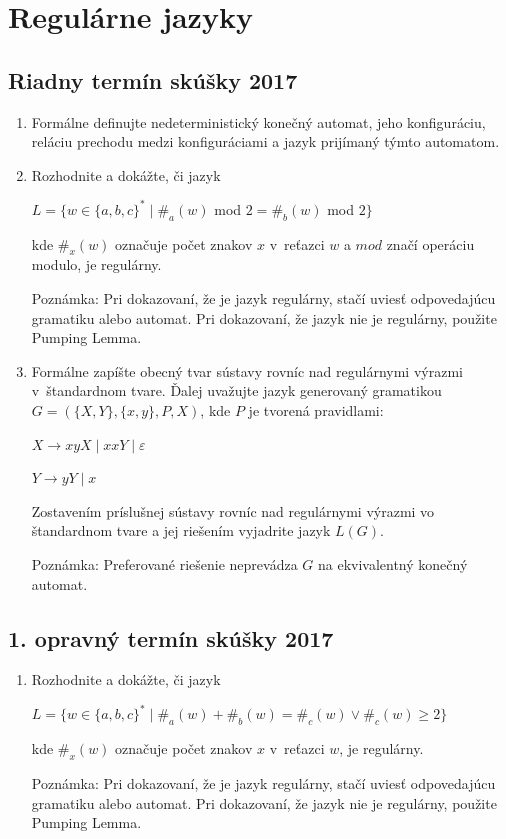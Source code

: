 \documentclass[11pt,a4paper]{article}
\begin{document}
	\section{Regulárne jazyky}

		\subsection{Riadny termín skúšky 2017}

		\begin{enumerate}
			\item Formálne definujte nedeterministický konečný automat, jeho konfiguráciu, reláciu prechodu medzi konfiguráciami a jazyk prijímaný týmto automatom.

			\item Rozhodnite a dokážte, či jazyk
	
			$L = \{w \in \{a,b,c\}^* \mid \#_a(w)$ mod $2 = \#_b(w)$ mod $2\}$
	
			kde $\#_x(w)$ označuje počet znakov $x$ v~reťazci $w$ a $mod$ značí operáciu modulo, je regulárny.
	
			Poznámka: Pri dokazovaní, že je jazyk regulárny, stačí uviesť odpovedajúcu gramatiku alebo automat. Pri dokazovaní, že jazyk nie je regulárny, použite Pumping Lemma.
	
			\item Formálne zapíšte obecný tvar sústavy rovníc nad regulárnymi výrazmi v~štandardnom tvare. Ďalej uvažujte jazyk generovaný gramatikou $G = (\{X,Y\}, \{x,y\}, P, X)$, kde $P$ je tvorená pravidlami:
	
			$X \rightarrow xyX \mid xxY \mid \varepsilon$
	
			$Y \rightarrow yY \mid x$
	
			Zostavením príslušnej sústavy rovníc nad regulárnymi výrazmi vo štandardnom tvare a jej riešením vyjadrite jazyk $L(G)$.
	
			Poznámka: Preferované riešenie neprevádza $G$ na ekvivalentný konečný automat.
		\end{enumerate}

		\subsection{1. opravný termín skúšky 2017}

		\begin{enumerate}
			\item Rozhodnite a dokážte, či jazyk

			$L = \{w \in \{a,b,c\}^* \mid \#_a(w) + \#_b(w) =  \#_c(w) \lor \#_c(w) \geq 2\}$
	
			kde $\#_x(w)$ označuje počet znakov $x$ v~reťazci $w$, je regulárny.
	
			Poznámka: Pri dokazovaní, že je jazyk regulárny, stačí uviesť odpovedajúcu gramatiku alebo automat. Pri dokazovaní, že jazyk nie je regulárny, použite Pumping Lemma.
		\end{enumerate}
\end{document}
